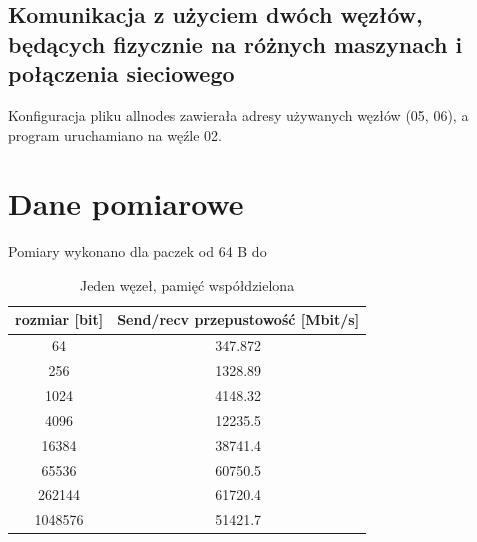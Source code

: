 \documentclass[10pt,english, openany]{book}
\begin{document}
\section{Komunikacja z użyciem dwóch węzłów, będących fizycznie na różnych maszynach i połączenia sieciowego}
Konfiguracja pliku allnodes zawierała adresy używanych węzłów (05, 06), a program uruchamiano na węźle 02.


\chapter{Dane pomiarowe}

Pomiary wykonano dla paczek od 64 B do 

\begin{table}[H]
\caption{Jeden węzeł, pamięć współdzielona}
\begin{center}
\begin{tabular}{|c|c|}
\hline
rozmiar {[}bit{]} & Send/recv przepustowość {[}Mbit/s{]} \\ \hline
64              & 347.872                              \\ \hline
256             & 1328.89                              \\ \hline
1024            & 4148.32                              \\ \hline
4096            & 12235.5                              \\ \hline
16384           & 38741.4                              \\ \hline
65536           & 60750.5                              \\ \hline
262144          & 61720.4                              \\ \hline
1048576         & 51421.7                              \\ \hline
\end{tabular}
\end{center}
\end{table}
\end{document}
